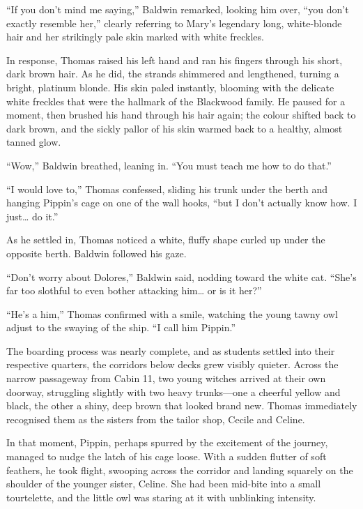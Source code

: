 \enquote{If you don't mind me saying,} Baldwin remarked, looking him over, \enquote{you don't exactly resemble her,} clearly referring to Mary's legendary long, white-blonde hair and her strikingly pale skin marked with white freckles.

In response, Thomas raised his left hand and ran his fingers through his short, dark brown hair. As he did, the strands shimmered and lengthened, turning a bright, platinum blonde. His skin paled instantly, blooming with the delicate white freckles that were the hallmark of the Blackwood family. He paused for a moment, then brushed his hand through his hair again; the colour shifted back to dark brown, and the sickly pallor of his skin warmed back to a healthy, almost tanned glow.

\enquote{Wow,} Baldwin breathed, leaning in. \enquote{You must teach me how to do that.}

\enquote{I would love to,} Thomas confessed, sliding his trunk under the berth and hanging Pippin's cage on one of the wall hooks, \enquote{but I don't actually know how. I just\ldots{} do it.}

As he settled in, Thomas noticed a white, fluffy shape curled up under the opposite berth. Baldwin followed his gaze.

\enquote{Don't worry about Dolores,} Baldwin said, nodding toward the white cat. \enquote{She's far too slothful to even bother attacking him\ldots{} or is it her?}

\enquote{He's a him,} Thomas confirmed with a smile, watching the young tawny owl adjust to the swaying of the ship. \enquote{I call him Pippin.}

The boarding process was nearly complete, and as students settled into their respective quarters, the corridors below decks grew visibly quieter. Across the narrow passageway from Cabin 11, two young witches arrived at their own doorway, struggling slightly with two heavy trunks---one a cheerful yellow and black, the other a shiny, deep brown that looked brand new. Thomas immediately recognised them as the sisters from the tailor shop, Cecile and Celine.

In that moment, Pippin, perhaps spurred by the excitement of the journey, managed to nudge the latch of his cage loose. With a sudden flutter of soft feathers, he took flight, swooping across the corridor and landing squarely on the shoulder of the younger sister, Celine. She had been mid-bite into a small tourtelette, and the little owl was staring at it with unblinking intensity.

